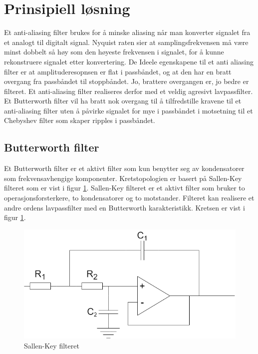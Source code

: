 \newpage
\section{Prinsipiell løsning}
\label{prinsipiellLoesning}

Et anti-aliasing filter brukes for å minske aliasing når man konverter signalet fra et analogt til digitalt signal. Nyquist raten sier at samplingsfrekvensen må være minst dobbelt så høy som den høyeste frekvensen i signalet, for å kunne rekonstruere signalet etter konvertering. De Ideele egenskapene til et anti aliasing filter er at amplituderesopnsen er flat i passbåndet, og at den har en bratt overgang fra passbåndet til stoppbåndet. Jo, brattere overgangen er, jo bedre er filteret. Et anti-aliasing filter realiseres derfor med et veldig agresivt lavpassfilter. Et Butterworth filter vil ha bratt nok overgang til å tilfredstille kravene til et anti-aliasing filter uten å påvirke signalet for mye i passbåndet i motsetning til et Chebyshev filter som skaper ripples i passbåndet.

\subsection{Butterworth filter}
\label{ButterworthFilter}

Et Butterworth filter er et aktivt filter som kun benytter seg av kondensatorer som frekvensavhengige komponenter. Kretstopologien er basert på Sallen-Key filteret som er vist i figur \ref{fig:SallenKey}. Sallen-Key filteret er et aktivt filter som bruker to operasjonsforsterkere, to kondensatorer og to motstander. Filteret kan realisere et andre ordens lavpassfilter med en Butterworth karakteristikk. Kretsen er vist i figur \ref{fig:SallenKey}. 

\begin{figure} [!h]
\centering
\includegraphics[width=0.7\linewidth]{Bilder/SallenKey.drawio.png}
\caption{Sallen-Key filteret}
\label{fig:SallenKey}
\end{figure}

